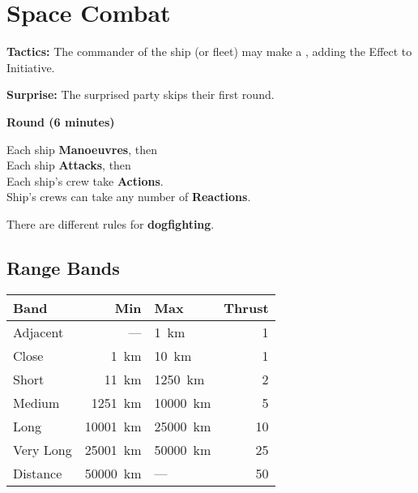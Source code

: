 \documentclass{cheatsheet}
\begin{document}
\section{Space Combat}

\begin{multicols}{3}
\begin{emphbox}
  \begin{center}
  \end{center}

  \textbf{Tactics:} The commander of the ship (or fleet) may make a
  , adding the Effect to Initiative.

  \textbf{Surprise:} The surprised party skips their first round.

  \begin{center}
    \textbf{Round (6 minutes)}
  \end{center}

  Each ship \textbf{Manoeuvres}, then\\
  Each ship \textbf{Attacks}, then\\
  Each ship's crew take \textbf{Actions}.\\
  Ship's crews can take any number of \textbf{Reactions}.

  There are different rules for \textbf{dogfighting}.
\end{emphbox}

\subsection{Range Bands}

\begin{tabularx}{\linewidth}{Xrlr} \toprule
  Band & Min & Max & Thrust \\ \midrule
  Adjacent & --- & \SI{1}{\kilo\meter} & 1 \\
  Close & \SI{1}{\kilo\meter} & \SI{10}{\kilo\meter} & 1 \\
  Short & \SI{11}{\kilo\meter} & \SI{1250}{\kilo\meter} & 2 \\
  Medium & \SI{1251}{\kilo\meter} & \SI{10000}{\kilo\meter} & 5 \\
  Long & \SI{10001}{\kilo\meter} & \SI{25000}{\kilo\meter} & 10 \\
  Very Long & \SI{25001}{\kilo\meter} & \SI{50000}{\kilo\meter} & 25 \\
  Distance & \SI{50000}{\kilo\meter} & --- & 50 \\ \bottomrule
\end{tabularx}


\end{multicols}
\end{document}
